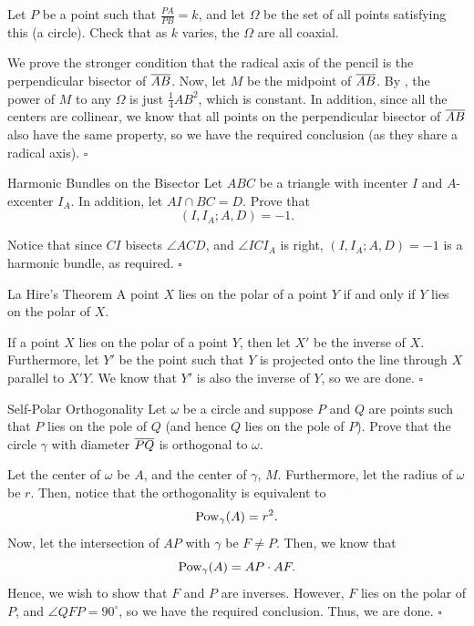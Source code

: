 \documentclass{article}
\begin{document}
\begin{problem}[9.21]{}
Let $P$ be a point such that $\tfrac{PA}{PB} = k$, and let $\Omega$ be the set of all points satisfying this (a circle). Check that as $k$ varies, the $\Omega$ are all coaxial.
\end{problem}

We prove the stronger condition that the radical axis of the pencil is the perpendicular bisector of $\overline{AB}$. Now, let $M$ be the midpoint of $\overline{AB}$. By , the power of $M$ to any $\Omega$ is just $\tfrac{1}{4}AB^2$, which is constant. In addition, since all the centers are collinear, we know that all points on the perpendicular bisector of $\overline{AB}$ also have the same property, so we have the required conclusion (as they share a radical axis). $\square$

\begin{problem}[9.22]{Harmonic Bundles on the Bisector}
Let $ABC$ be a triangle with incenter $I$ and $A$-excenter $I_A$. In addition, let $AI \cap BC = D$. Prove that \[(I,I_A; A, D) = -1.\]
\end{problem}

Notice that since $CI$ bisects $\angle ACD$, and $\angle ICI_A$ is right, $(I,I_A; A, D) = -1$ is a harmonic bundle, as required. $\square$

\begin{problem}[9.26]{La Hire's Theorem}
A point $X$ lies on the polar of a point $Y$ if and only if $Y$ lies on the polar of $X$.
\end{problem}

If a point $X$ lies on the polar of a point $Y$, then let $X'$ be the inverse of $X$. Furthermore, let $Y'$ be the point such that $Y$ is projected onto the line through $X$ parallel to $X'Y$. We know that $Y'$ is also the inverse of $Y$, so we are done. $\square$

\begin{problem}[9.27]{Self-Polar Orthogonality}
Let $\omega$ be a circle and suppose $P$ and $Q$ are points such that $P$ lies on the pole of $Q$ (and hence $Q$ lies on the pole of $P$). Prove that the
circle $\gamma$ with diameter $\overline{PQ}$ is orthogonal to $\omega$. 
\end{problem}

Let the center of $\omega$ be $A$, and the center of $\gamma$, $M$. Furthermore, let the radius of $\omega$ be $r$. Then, notice that the orthogonality is equivalent to \[\text{Pow}_{\gamma}(A) = r^2.\] Now, let the intersection of $AP$ with $\gamma$ be $F \neq P$. Then, we know that \[\text{Pow}_{\gamma}(A) = AP\cdot AF.\] Hence, we wish to show that $F$ and $P$ are inverses. However, $F$ lies on the polar of $P$, and $\angle QFP = 90^\circ$, so we have the required conclusion. Thus, we are done. $\square$
\end{document}
